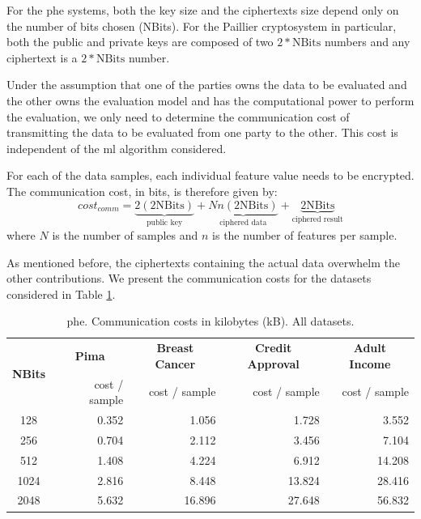 For the \ac{phe} systems, both the key size and the ciphertexts size depend only on the number of bits chosen (NBits). For the Paillier cryptosystem in particular, both the public and private keys are composed of two $2*\text{NBits}$ numbers and any ciphertext is a $2*\text{NBits}$ number.

Under the assumption that one of the parties owns the data to be evaluated and the other owns the evaluation model and has the computational power to perform the evaluation, we only need to determine the communication cost of transmitting the data to be evaluated from one party to the other. This cost is independent of the \ac{ml} algorithm considered.

For each of the data samples, each individual feature value needs to be encrypted. The communication cost, in bits, is therefore given by:
\begin{equation}
\label{eq:PHE_commCost}
cost_{comm} = \underbrace{2(2\text{NBits})}_{\text{public key}} + \underbrace{Nn(2\text{NBits})}_{\text{ciphered data}} + \underbrace{2\text{NBits}}_{\text{ciphered result}} 
\end{equation}
where $N$ is the number of samples and $n$ is the number of features per sample.

As mentioned before, the ciphertexts containing the actual data overwhelm the other contributions. We present the communication costs for the datasets considered in Table \ref{table:PHECommCost}.

\begin{table}[htp]
\centering
\caption{\acs{phe}. Communication costs in kilobytes (kB). All datasets.}
\label{table:PHECommCost}
\vspace*{0.2cm}
\begin{tabular}{|c|r|r|r|r|}
\hline
\multirow{2}{*}{\textbf{NBits}} & \multicolumn{1}{c|}{\textbf{Pima}}          & \multicolumn{1}{c|}{\textbf{Breast Cancer}} & \multicolumn{1}{c|}{\textbf{Credit Approval}} & \multicolumn{1}{c|}{\textbf{Adult Income}}   \\ \cline{2-5}
                       & cost / sample & cost / sample & cost / sample   & cost / sample  \\ \hline
128       & 0.352        & 1.056          & 1.728          & 3.552         \\ \hline
256       & 0.704        & 2.112          & 3.456          & 7.104         \\ \hline
512       & 1.408        & 4.224          & 6.912          & 14.208        \\ \hline
1024      & 2.816        & 8.448          & 13.824         & 28.416        \\ \hline
2048      & 5.632        & 16.896         & 27.648         & 56.832        \\ \hline
\end{tabular}
\end{table}


